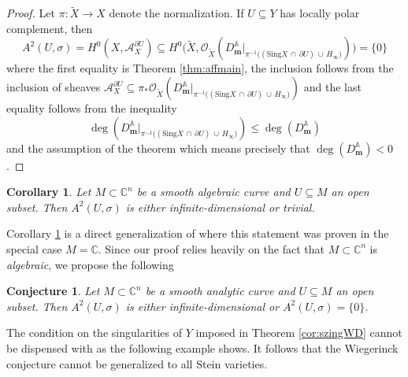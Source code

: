 \documentclass[11pt]{amsart}
\newtheorem{corollary}[theorem]{Corollary}
\newtheorem{conj}[theorem]{Conjecture}
\theoremstyle{definition}
\newcommand{\bC}{{\mathbb C}}
\begin{document}
\begin{proof}
    Let $\pi: \widetilde{X} \to X$ denote the normalization. If $U \subseteq Y$ has locally polar complement, then $$A^2(U,\sigma) = H^0(X,\mathcal{A}_X^{\partial U}) \subseteq H^0\big(\widetilde{X},\mathcal{O}_{\widetilde{X}}(D_\mathbf{m}^{\mathbb{A}}\big|_{\pi^{-1}\big((\text{Sing}X \,\cap\, \partial U )\,\cup\, H_\infty \big)})\big) = \{0\}$$
    where the first equality is Theorem \ref{thm:affmain}, the inclusion follows from the inclusion of sheaves $\mathcal{A}_X^{\partial U} \subseteq \pi_*\mathcal{O}_{\widetilde{X}}(D_\mathbf{m}^{\mathbb{A}}\big|_{\pi^{-1}\big((\text{Sing}X \,\cap\, \partial U )\,\cup\, H_\infty \big)})$ and the last equality follows from the inequality $$\deg(D_\mathbf{m}^{\mathbb{A}}\big|_{\pi^{-1}\big((\text{Sing}X \,\cap\, \partial U )\,\cup\, H_\infty \big)}) \leq \deg(D_\mathbf{m}^\mathbb{A})$$
    and the assumption of the theorem which means precisely that $\deg(D_\mathbf{m}^\mathbb{A}) < 0$.
\end{proof}

\begin{corollary}\label{cor:simaffin}
    Let $M \subset \bC^n$ be a smooth algebraic curve and $U \subseteq M$ an open subset. Then $A^2(U,\sigma)$ is either infinite-dimensional or trivial.
\end{corollary}

\noindent Corollary \ref{cor:simaffin} is a direct generalization of \cite{Wiegerinck} where this statement was proven in the special case $M=\bC$. Since our proof relies heavily on the fact that $M \subset \bC^n$ is \emph{algebraic}, we propose the following

\begin{conj}\label{conj:analytic}
    Let $M \subset \bC^n$ be a smooth analytic curve and $U \subseteq M$ an open subset. Then $A^2(U,\sigma)$ is either infinite-dimensional or $A^2(U,\sigma) = \{0\}$.
\end{conj}

\noindent The condition on the singularities of $Y$ imposed in Theorem \ref{cor:szingWD} cannot be dispensed with as the following example shows. It follows that the Wiegerinck conjecture cannot be generalized to all Stein varieties.
\end{document}
